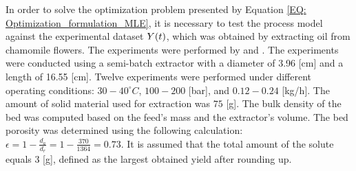 \documentclass[../Article_Model_Parameters.tex]{subfiles}
\begin{document}
	
	\label{CH: Experiments}
	
	
	
	In order to solve the optimization problem presented by Equation \ref{EQ: Optimization_formulation_MLE}, it is necessary to test the process model against the experimental dataset ${\color{black}Y}(t)$, which was obtained by extracting oil from chamomile flowers. The experiments were performed by \citet{Povh2001} and \citet{Rahimi2011}. The experiments were conducted using a semi-batch extractor with a diameter of 3.96 [cm] and a length of 16.55 [cm]. Twelve experiments were performed under different operating conditions: $30-40^\circ C$, $100 - 200$ [bar], and $0.12 - 0.24$ [kg/h]. The amount of solid material used for extraction was $75$ [g]. The bulk density of the bed was computed based on the feed's mass and the extractor's volume. The bed porosity was determined using the following calculation: $\epsilon=1-\frac{d_a}{d_r} = 1-\frac{370}{1364} = 0.73$. It is assumed that the total amount of the solute equals 3 [g], defined as the largest obtained yield after rounding up.
	
\end{document}
